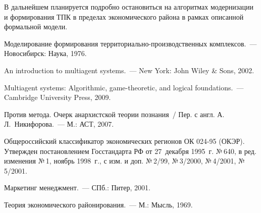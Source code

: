 \begin{multicols}{2}
  В дальнейшем планируется подробно остановиться на алгоритмах 
модернизации и формирования ТПК в пределах экономического района в 
рамках описанной формальной модели.

{\small\frenchspacing
{%
\begin{thebibliography}{9}

Моделирование формирования 
тер\-ри\-то\-ри\-аль\-но-про\-из\-вод\-ст\-вен\-ных комплексов.~--- 
Новосибирск: Наука, 1976.

An introduction to multiagent systems.~--- New York: John Wiley \& Sons, 2002.

Multiagent systems: Algorithmic, game-theoretic, and logical foundations.~--- 
Cambridge University Press, 2009.

Против метода. Очерк анархистской тео\-рии познания~/ Пер. с англ. 
А.\,Л.~Никифорова.~--- М.: АСТ, 2007. 

Общероссийский классификатор экономических регионов ОК 024-95 (ОКЭР). 
Утвержден постановлением Госстандарта РФ от 27~декабря 1995~г. №\,640, в 
ред. изменения №\,1, ноябрь 1998~г., с изм. и доп. №\,2/99, №\,3/2000, 
№\,4/2001, №\,5/2001.

Маркетинг менеджмент.~--- СПб.: Питер, 2001.

 \label{end\stat}

Теория экономического 
районирования.~--- М.: Мысль, 1969.


 \end{thebibliography}
}
}


\end{multicols}  